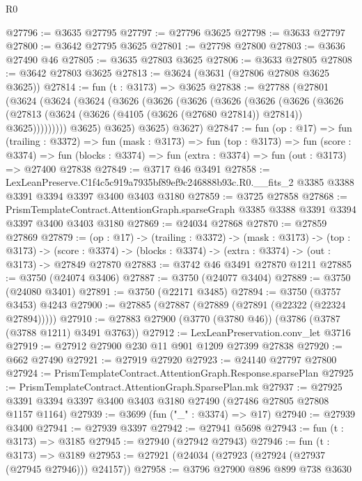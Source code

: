 \begin{lexlean}{R0}
\begin{coremodule}
@27796 := @3635 @27795
@27797 := @27796 @3625
@27798 := @3633 @27797
@27800 := @3642 @27795 @3625
@27801 := @27798 @27800
@27803 := @3636 @27490 @46
@27805 := @3635 @27803 @3625
@27806 := @3633 @27805
@27808 := @3642 @27803 @3625
@27813 := @3624 (@3631 (@27806 @27808 @3625 @3625))
@27814 := fun (t : @3173) => @3625
@27838 := @27788
    (@27801
      (@3624
        (@3624
          (@3624
            (@3626
              (@3626
                (@3626
                  (@3626
                    (@3626
                      (@3626
                        (@3626
                          (@27813
                            (@3624 (@3626 (@4105 (@3626 (@27680 @27814)) @27814)) @3625)))))))))
            @3625)
          @3625)
        @3625)
      @3627)
@27847 := fun (op : @17) =>
  fun (trailing : @3372) =>
  fun (mask : @3173) =>
  fun (top : @3173) =>
  fun (score : @3374) =>
  fun (blocks : @3374) => fun (extra : @3374) => fun (out : @3173) => @27400 @27838
@27849 := @3717 @46 @3491
@27858 := LexLeanPreserve.C1f4c5c919a7935bf89ef9c246888b93c.R0.__fits_2
    @3385
    @3388
    @3391
    @3394
    @3397
    @3400
    @3403
    @3180
@27859 := @3725 @27858
@27868 := PrismTemplateContract.AttentionGraph.sparseGraph
    @3385
    @3388
    @3391
    @3394
    @3397
    @3400
    @3403
    @3180
@27869 := @24034 @27868
@27870 := @27859 @27869
@27879 := (op : @17) ->
  (trailing : @3372) ->
  (mask : @3173) ->
  (top : @3173) ->
  (score : @3374) -> (blocks : @3374) -> (extra : @3374) -> (out : @3173) -> @27849 @27870
@27883 := @3742 @46 @3491 @27870 @1211
@27885 := @3750 (@24074 @3406)
@27887 := @3750 (@24077 @3404)
@27889 := @3750 (@24080 @3401)
@27891 := @3750 (@22171 @3485)
@27894 := @3750 (@3757 @3453) @4243
@27900 := @27885 (@27887 (@27889 (@27891 (@22322 (@22324 @27894)))))
@27910 := @27883 @27900 (@3770 (@3780 @46)) (@3786 (@3787 (@3788 @1211) @3491 @3763))
@27912 := LexLeanPreservation.conv_let @3716
@27919 := @27912 @27900 @230 @11 @901 @1209 @27399 @27838
@27920 := @662 @27490
@27921 := @27919 @27920
@27923 := @24140 @27797 @27800
@27924 := PrismTemplateContract.AttentionGraph.Response.sparsePlan
@27925 := PrismTemplateContract.AttentionGraph.SparsePlan.mk
@27937 := @27925 @3391 @3394 @3397 @3400 @3403 @3180 @27490 (@27486 @27805 @27808 @1157 @1164)
@27939 := @3699 (fun ("_" : @3374) => @17)
@27940 := @27939 @3400
@27941 := @27939 @3397
@27942 := @27941 @5698
@27943 := fun (t : @3173) => @3185
@27945 := @27940 (@27942 @27943)
@27946 := fun (t : @3173) => @3189
@27953 := @27921 (@24034 (@27923 (@27924 (@27937 (@27945 @27946))) @24157))
@27958 := @3796 @27900 @896 @899 @738 @3630

\end{coremodule}
\end{lexlean}
